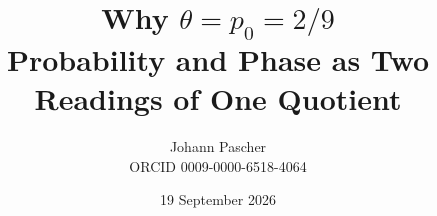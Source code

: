 \documentclass[11pt,a4paper]{report}
\title{Why $\theta = p_0 = 2/9$\\[0.5em]\large Probability and Phase as Two Readings of One Quotient}
\date{19 September 2026}
\author{Johann Pascher\\\small ORCID 0009-0000-6518-4064}
\begin{document}
\renewcommand{\thechapter}{}
\renewcommand{\thesection}{\arabic{section}}
\maketitle
\tableofcontents

\end{document}

